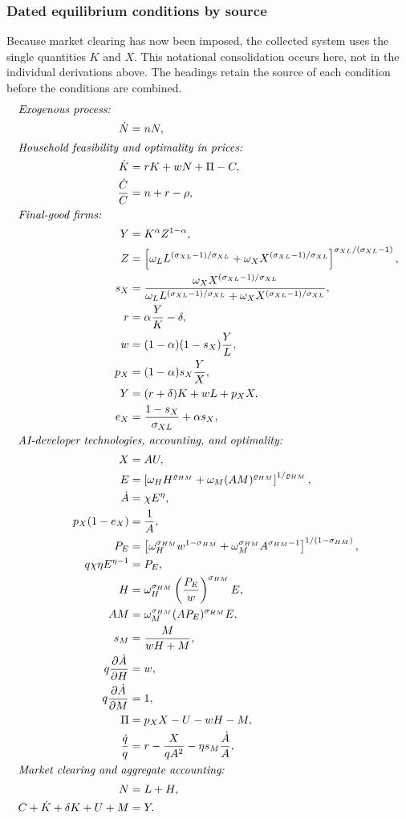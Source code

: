 \subsubsection{Dated equilibrium conditions by source}
\label{sec:axm-dated-equilibrium-system}
Because market clearing has now been imposed, the collected system uses the
single quantities \(K\) and \(X\). This notational consolidation occurs here,
not in the individual derivations above. The headings retain the source of each
condition before the conditions are combined.
\begingroup
\allowdisplaybreaks[4]
\begin{align}
\intertext{\textit{Exogenous process:}}
 \dot N&=nN,\\
\intertext{\textit{Household feasibility and optimality in prices:}}
 \dot K&=rK+wN+\Pi-C,\\
 \frac{\dot C}{C}&=n+r-\rho,\\
\intertext{\textit{Final-good firms:}}
 Y&=K^\alpha Z^{1-\alpha},\\
 Z&=\left[
 \omega_L L^{(\sigma_{XL}-1)/\sigma_{XL}}
 +\omega_X X^{(\sigma_{XL}-1)/\sigma_{XL}}
 \right]^{\sigma_{XL}/(\sigma_{XL}-1)},\\
 s_X&=\frac{\omega_X X^{(\sigma_{XL}-1)/\sigma_{XL}}}
 {\omega_LL^{(\sigma_{XL}-1)/\sigma_{XL}}
 +\omega_X X^{(\sigma_{XL}-1)/\sigma_{XL}}},\\
 r&=\alpha\frac{Y}{K}-\delta,\\
 w&=(1-\alpha)(1-s_X)\frac{Y}{L},\\
 p_X&=(1-\alpha)s_X\frac{Y}{X},\\
 Y&=(r+\delta)K+wL+p_XX,\\
 e_X&=\frac{1-s_X}{\sigma_{XL}}+\alpha s_X,\\
\intertext{\textit{AI-developer technologies, accounting, and optimality:}}
 X&=AU,\\
 E&=\left[\omega_HH^{\varrho_{HM}}
 +\omega_M(AM)^{\varrho_{HM}}\right]^{1/\varrho_{HM}},\\
 \dot A&=\chi E^\eta,\\
 p_X(1-e_X)&=\frac{1}{A},\\
 P_E&=\left[
 \omega_H^{\sigma_{HM}}w^{1-\sigma_{HM}}
 +\omega_M^{\sigma_{HM}}A^{\sigma_{HM}-1}
 \right]^{1/(1-\sigma_{HM})},\\
 q\chi\eta E^{\eta-1}&=P_E,\\
 H&=\omega_H^{\sigma_{HM}}
 \left(\frac{P_E}{w}\right)^{\sigma_{HM}}E,\\
 AM&=\omega_M^{\sigma_{HM}}(AP_E)^{\sigma_{HM}}E,\\
 s_M&=\frac{M}{wH+M},\\
 q\frac{\partial\dot A}{\partial H}&=w,\\
 q\frac{\partial\dot A}{\partial M}&=1,\\
 \Pi&=p_XX-U-wH-M,\\
 \frac{\dot q}{q}&=r-\frac{X}{qA^2}
 -\eta s_M\frac{\dot A}{A},\\
\intertext{\textit{Market clearing and aggregate accounting:}}
 N&=L+H,\\
 C+\dot K+\delta K+U+M&=Y.
\end{align}
